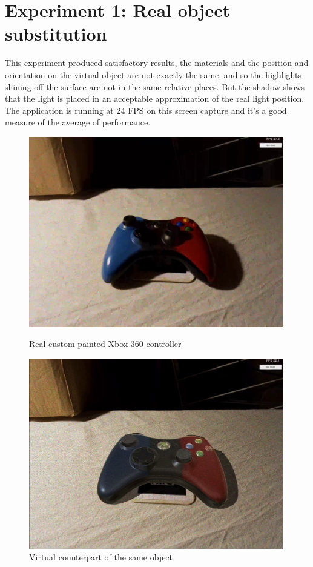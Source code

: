 \section{Experiment 1: Real object substitution}

This experiment produced satisfactory results, the materials and the position and orientation on the virtual object are not exactly the same, and so the highlights shining off the surface are not in the same relative places. But the shadow shows that the light is placed in an acceptable approximation of the real light position. The application is running at 24 FPS on this screen capture and it's a good measure of the average of performance. 
\begin{figure}[H]
    \centering
    \begin{minipage}{0.475\textwidth}
        \centering
        \includegraphics[width=0.99\textwidth]{Figures/ContReal.png} %
        \caption{Real custom painted Xbox 360 controller}
    \end{minipage}\hfill
    \begin{minipage}{0.475\textwidth}
        \centering
        \includegraphics[width=0.99\textwidth]{Figures/ContVirtual.png} %
        \caption{Virtual counterpart of the same object}
    \end{minipage}
\end{figure}


